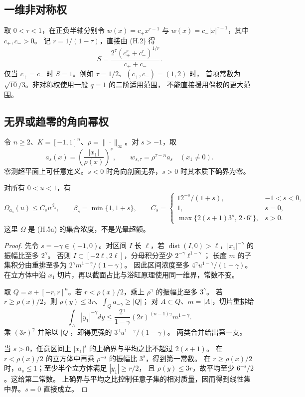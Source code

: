 \subsection{一维非对称权}
取 $0<\tau<1$，在正负半轴分别令
$w(x)=c_+x^{\tau-1}$ 与 $w(x)=c_-|x|^{\tau-1}$，其中 $c_+,c_->0$。
记 $r=1/(1-\tau)$，直接由 (H.2) 得
\[S=\frac{2^\tau(c_+^r+c_-^r)^{1/r}}{c_++c_-}.\tag{A.5}\]
仅当 $c_+=c_-$ 时 $S=1$。例如 $\tau=1/2$、$(c_+,c_-)=(1,2)$ 时，
首项常数为 $\sqrt{10}/3$。非对称权使用一般 $q=1$ 的二阶适用范围，
不能直接援用偶权的更大范围。

\subsection{无界或趋零的角向幂权}\label{subsec:signed-angular-powers}
令 $n\ge2$、$K=[-1,1]^n$、$\rho=\|\cdot\|_\infty$。对 $s>-1$，取
\[
a_s(x)=\left(\frac{|x_1|}{\rho(x)}\right)^s,
\qquad w_{s,\tau}=\rho^{\tau-n}a_s\quad(x_1\ne0).
\]
零测超平面上可任意定义。$s<0$ 时角向剖面无界，$s>0$ 时其本质下确界为零。

\begin{lemma}[角向幂权的集中界]\label{lem:angular-power-concentration}
对所有 $0<u<1$，有
\[
\Omega_{a_s}(u)\le C_su^{\beta_s},\qquad
\beta_s=\min\{1,1+s\},\qquad
C_s=\begin{cases}
12^{-s}/(1+s),&-1<s<0,\\
1,&s=0,\\
\max\{2(s+1)3^s,\,2\cdot6^s\},&s>0.
\end{cases}\tag{A.6}
\]
这里 $\Omega$ 是 (H.5a) 的集合浓度，不是光晕超额。
\end{lemma}
\begin{proof}
先令 $s=-\gamma\in(-1,0)$。对区间 $I$ 长 $\ell$，若
$\operatorname{dist}(I,0)>\ell$，$|x_1|^{-\gamma}$ 的振幅比至多 $2^\gamma$。
否则 $I\subset[-2\ell,2\ell]$，分母积分至少 $2^{-\gamma}\ell^{1-\gamma}$；
长度 $m$ 的子集积分由重排至多为 $2^\gamma m^{1-\gamma}/(1-\gamma)$。
因此区间浓度至多 $4^\gamma u^{1-\gamma}/(1-\gamma)$。
在立方体中沿 $x_1$ 切片，再以截面占比与浴缸原理使用同一维界，常数不变。

取 $Q=x+[-r,r]^n$。若 $r<\rho(x)/2$，乘上 $\rho^\gamma$ 的振幅比至多 $3^\gamma$。
若 $r\ge\rho(x)/2$，则 $\rho(y)\le3r$、$\int_Qa_{-\gamma}\ge|Q|$；
对 $A\subset Q$、$m=|A|$，切片重排给
\[
\int_A|y_1|^{-\gamma}dy\le
\frac{2^\gamma}{1-\gamma}(2r)^{(n-1)\gamma}m^{1-\gamma}.
\]
乘 $(3r)^\gamma$ 并除以 $|Q|$，即得更强的 $3^\gamma u^{1-\gamma}/(1-\gamma)$。
两类合并给出第一支。

当 $s>0$，任意区间上 $|x_1|^s$ 的上确界与平均之比不超过 $2(s+1)$。
在 $r<\rho(x)/2$ 的立方体中再乘 $\rho^{-s}$ 的振幅比 $3^s$，得到第一常数。
在 $r\ge\rho(x)/2$ 时，$a_s\le1$；至少半个立方体满足 $|y_1|\ge r/2$，
且 $\rho(y)\le3r$，故平均至少 $6^{-s}/2$。这给第二常数。
上确界与平均之比控制任意子集的相对质量，因而得到线性集中界。$s=0$ 直接成立。
\end{proof}

